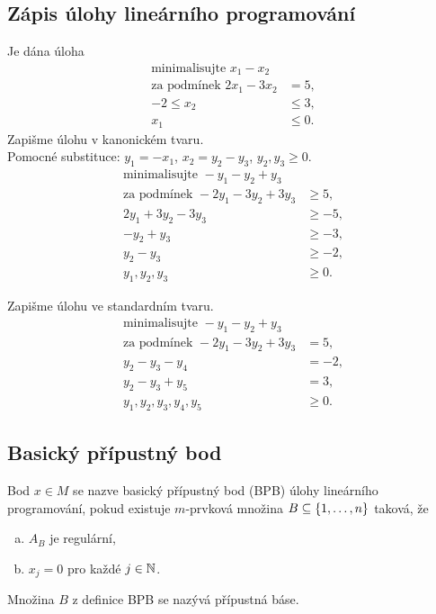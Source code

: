 \subsection{Zápis úlohy lineárního programování}
Je dána úloha
\begin{align*}
    \text{minimalisujte } x_1 - x_2 \\
    \text{za podmínek } 2x_1 - 3x_2 &= 5, \\
    -2 \leq x_2 &\leq 3, \\
    x_1 &\leq 0. 
\end{align*}
Zapišme úlohu v kanonickém tvaru.\\
Pomocné substituce: $y_1 = -x_1$, $x_2 = y_2 - y_3$, $y_2, y_3 \geq 0$.
\begin{align*}
    \text{minimalisujte } -y_1-y_2+y_3 \\
    \text{za podmínek } -2y_1 - 3y_2 + 3y_3 &\geq 5, \\
    2y_1 + 3y_2 - 3y_3 &\geq -5, \\
    -y_2 + y_3 &\geq -3, \\
    y_2 - y_3 &\geq -2,\\
    y_1, y_2, y_3 &\geq 0.
\end{align*}

Zapišme úlohu ve standardním tvaru.
\begin{align*}
    \text{minimalisujte } -y_1-y_2+y_3 \\
    \text{za podmínek } -2y_1 - 3y_2 + 3y_3 & = 5, \\
    y_2 - y_3 - y_4 &= -2, \\
    y_2 - y_3 + y_5 &= 3, \\
    y_1, y_2, y_3, y_4, y_5 &\geq 0.
\end{align*}

\subsection{Basický přípustný bod}\label{BPB}
Bod $x \in M$ se nazve basický přípustný bod (BPB) úlohy lineárního programování, pokud existuje $m$-prvková množina 
$B \subseteq \left\lbrace 1, \dots, n \right\rbrace$ taková, že 
\begin{enumerate}[(a)]
    \item $A_B$ je regulární,
    \item $x_j = 0$ pro každé $j \in \mathbb{N}$.
\end{enumerate}
Množina $B$ z definice BPB se nazývá přípustná báse.

